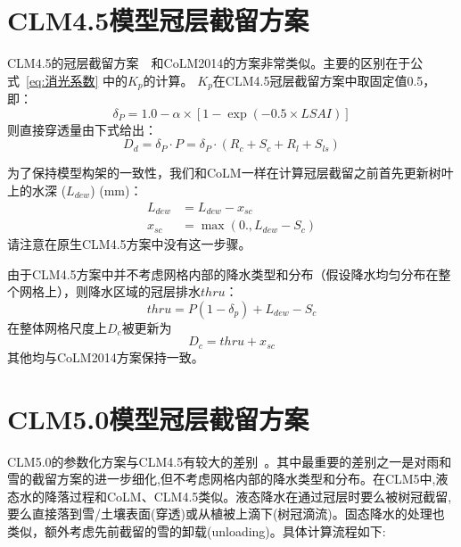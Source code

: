 \section{CLM4.5模型冠层截留方案}
CLM4.5的冠层截留方案~\citet{oleson2013technical}~和CoLM2014的方案非常类似。主要的区别在于公式~\eqref{eq:消光系数} 中的$K_p$的计算。
$K_p$在CLM4.5冠层截留方案中取固定值0.5，即：
%
\begin{equation}
\delta_{P}=1.0-\alpha \times\left[1-\exp \left(-0.5 \times LSAI\right)\right]
\end{equation}
则直接穿透量由下式给出：
\begin{equation}
D_{d}=\delta_{P} \cdot P=\delta_{P} \cdot\left(R_{c}+S_{c}+R_{l}+S_{l s}\right)
\end{equation}

为了保持模型构架的一致性，我们和CoLM一样在计算冠层截留之前首先更新树叶上的水深 ($L_{dew}$) (mm)：
\begin{equation}
\begin{aligned}
L_{dew} &= L_{dew}-x_{sc} \\
x_{s c} &= \max \left(0., L_{dew}-S_{c}\right)
\end{aligned}
\end{equation}
请注意在原生CLM4.5方案中没有这一步骤。

由于CLM4.5方案中并不考虑网格内部的降水类型和分布（假设降水均匀分布在整个网格上），则降水区域的冠层排水$thru$：
\begin{equation}
thru=P\left(1-\delta_{p}\right)+L_{dew}-S_{c}
\end{equation}
在整体网格尺度上$D_c$被更新为
\begin{equation}
D_c=thru+x_{s c}
\end{equation}
其他均与CoLM2014方案保持一致。

\section{CLM5.0模型冠层截留方案}
CLM5.0的参数化方案与CLM4.5有较大的差别~\citep{lawrence2019community}。其中最重要的差别之一是对雨和雪的截留方案的进一步细化,但不考虑网格内部的降水类型和分布。在CLM5中,液态水的降落过程和CoLM、CLM4.5类似。液态降水在通过冠层时要么被树冠截留,要么直接落到雪/土壤表面(穿透)或从植被上滴下(树冠滴流)。固态降水的处理也类似，额外考虑先前截留的雪的卸载(unloading)。具体计算流程如下:

